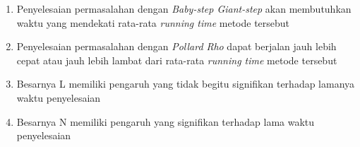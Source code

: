 \begin{enumerate}
	\item Penyelesaian permasalahan dengan \textit{Baby-step Giant-step} akan membutuhkan waktu yang mendekati rata-rata \textit{running time} metode tersebut
	\item Penyelesaian permasalahan dengan \textit{Pollard Rho} dapat berjalan jauh lebih cepat atau jauh lebih lambat dari rata-rata \textit{running time} metode tersebut
	\item Besarnya L memiliki pengaruh yang tidak begitu signifikan terhadap lamanya waktu penyelesaian
	\item Besarnya N memiliki pengaruh yang signifikan terhadap lama waktu penyelesaian
\end{enumerate}